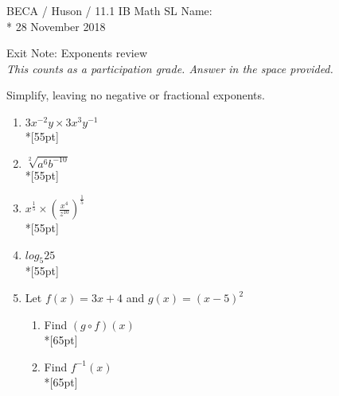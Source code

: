 \documentclass[]{book}
\begin{document}
\noindent BECA / Huson / 11.1 IB Math SL \hspace{2in} Name:\\*
28 November 2018
\begin{center}
{\Large Exit Note: Exponents review}\\
\textit{This counts as a participation grade. Answer in the space provided.}
\end{center}

Simplify, leaving no negative or fractional exponents.


\begin{enumerate}

\item $3x^{-2}y \times 3x^3 y^{-1}$\\*[55pt]
\item $\sqrt[2]{a^6 b^{-10}}$\\*[55pt]
\item $\displaystyle x^{\frac{1}{5}} \times (\frac{x^4}{z^{10}})^{\frac{1}{5}}$\\*[55pt]
\item $log_5 25$\\*[55pt]

\newpage
\item Let $f(x) = 3x+4$ and $g(x)=(x-5)^2$
\begin{enumerate}
    \item Find $(g \circ f)(x)$\\*[65pt]
    \item Find $f^{-1}(x)$\\*[65pt]
\end{enumerate}
\end{enumerate}
\end{document}
